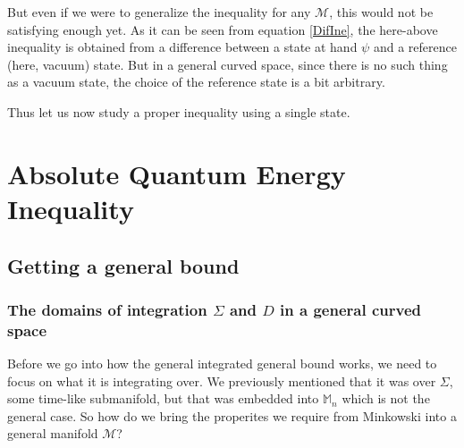 \documentclass[a4paper,11pt]{article}
\numberwithin{equation}{section}
\theoremstyle{definition}
\begin{document}
But even if we were to generalize the inequality for any $\mathcal{M}$, this would not be satisfying enough yet. As it can be seen from equation \ref{DifIne}, the here-above inequality is obtained from a difference between a state at hand $\psi$ and a reference (here, vacuum) state. But in a general curved space, since there is no such thing as a vacuum state, the choice of the reference state is a bit arbitrary. 

\noindent Thus let us now study a proper inequality using a single state.

\section{Absolute Quantum Energy Inequality}
\subsection{Getting a general bound}
\subsubsection{The domains of integration $\Sigma$ and $D$ in a general curved space}
Before we go into how the general integrated general bound works, we need to focus on what it is integrating over. We previously mentioned that it was over $\Sigma$, some time-like submanifold, but that was embedded into $\mathbb{M}_n$ which is not the general case. So how do we bring the properites we require from Minkowski into a general manifold $\mathcal{M}$?
\end{document}

